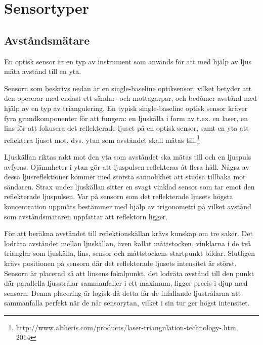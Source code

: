 \documentclass[a4paper,12pt,fleqn]{article}
\begin{document}
\section{Sensortyper}

\subsection{Avståndsmätare}
En optisk sensor är en typ av instrument som används för att med hjälp av ljus mäta avstånd till en yta.

Sensorn som beskrivs nedan är en single-baseline optiksensor, vilket betyder att den opererar med endast ett sändar- och mottagarpar, och bedömer avstånd med hjälp av en typ av triangulering.
En typisk single-baseline optisk sensor kräver fyra grundkomponenter för att fungera:
en ljuskälla i form av t.ex. en laser, en lins för att fokusera det reflekterade ljuset på 
en optisk sensor, samt en yta att reflektera ljuset mot, dvs. ytan som avståndet skall mätas till.\footnote{http://www.altheris.com/products/laser-triangulation-technology-.htm, 2014}

Ljuskällan riktas rakt mot den yta som avståndet ska mätas till och en ljuspuls avfyras. Ojämnheter i ytan gör att ljuspulsen reflekteras åt flera håll. Några av dessa ljusreflektioner kommer med största sannolikhet att studsa tillbaka mot sändaren.
Strax under ljuskällan sitter en svagt vinklad sensor som tar emot den reflekterade ljuspulsen.  Var på sensorn som det reflekterade ljusets högsta koncentration uppmäts bestämmer med hjälp av trigonometri på vilket avstånd som avståndsmätaren uppfattar att reflektorn ligger.

För att beräkna avståndet till reflektionskällan krävs kunskap om tre saker.
Det lodräta avståndet mellan ljuskällan, även kallat måttstocken, vinklarna i de två trianglar som ljuskälla, lins, sensor och måttstockens startpunkt bildar. Slutligen krävs positionen på sensorn där det reflekterade ljusets intensitet är störst. Sensorn är placerad så att linsens fokalpunkt, det lodräta avstånd till den punkt där parallella ljusstrålar sammanfaller i ett maximum, ligger precis i djup med sensorn. Denna placering är logisk då detta får de infallande ljustrålarna att sammanfalla perfekt när de når sensorytan, vilket i sin tur ger högst intensitet.
\end{document}
